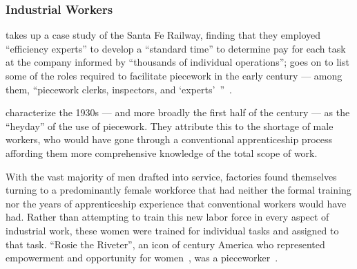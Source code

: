 \documentclass[trackingWork]{subfiles}
\begin{document}
\subsubsection{Industrial Workers}
\citeauthor{10.2307/23702539} takes up a case study of the Santa Fe Railway,
finding that they employed ``efficiency experts'' to develop a ``standard time''
to determine pay for each task at the company informed by
``thousands of individual operations''; %
\citeauthor{10.2307/23702539} goes on to list
some of the roles required to facilitate piecework
in the early  century
--- among them, ``piecework clerks, inspectors, and `experts'~''~\cite{10.2307/23702539}. 

\citeauthor{hart2013rise} characterize the 1930s
--- and more broadly the first half of the  century ---
as the ``heyday'' of the use of piecework.
They attribute this to the shortage of male workers,
who would have gone through a conventional apprenticeship process
affording them more comprehensive knowledge of the total scope of work.

With the vast majority of men drafted into service,
factories found themselves turning to
a predominantly female workforce that had neither
the formal training nor
the years of apprenticeship experience
that conventional workers would have had.
Rather than attempting to train this new labor force in every aspect of industrial work,
these women were trained for individual tasks
and assigned to that task. %
``Rosie the Riveter'',
an icon of  century America who
represented empowerment and opportunity for women~\cite{honey1985creating},
was a pieceworker~\cite{davies2014origins}.
\end{document}
